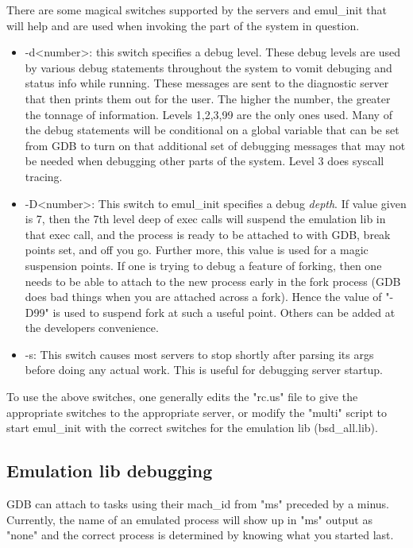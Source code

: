 There are some magical switches supported by the servers and emul\_init
that will help and are used when invoking the part of the system in question.
\begin{itemize}
\item{-d<number>}: this switch specifies a debug level.  These debug levels are
used by various debug statements throughout the system to vomit debuging and
status
info while running.  These messages are sent to the diagnostic server
that then prints them out for the user.  The higher the number, the greater
the tonnage of information.  Levels 1,2,3,99 are the only ones used.
Many of the debug statements will be conditional on a global variable
that can be set from GDB to turn on that additional set of debugging messages
that may not be needed when debugging other parts of the system. Level 3
does syscall tracing.

\item{-D<number>}:  This switch to emul\_init specifies a debug {\em depth}.
If value given
is 7, then the 7th level deep of exec calls will suspend the emulation lib
in that exec call, and the process is ready to be attached to with GDB,
break points set, and off you go. Further more, this value is used
for a magic suspension points.  If one is trying to debug a feature of forking,
then one needs to be able to attach to the new process early in the fork
process (GDB does bad things when you are attached across a fork).  Hence
the value of "-D99" is used to suspend fork at such a useful point.  Others
can be added at the developers convenience.

\item{-s}:  This switch causes most servers to stop shortly after parsing
its args before doing any actual work.  This is useful for debugging
server startup.
\end{itemize}
To use the above switches, one generally edits the "rc.us" file to
give the appropriate switches to the appropriate server, or modify
the "multi" script to start emul\_init with the correct switches for the
emulation lib (bsd\_all.lib).

\subsection{Emulation lib debugging}
GDB can attach to tasks using their mach\_id from "ms" preceded by a minus.
Currently, the name of an emulated process will show up in "ms" output as
"none" and the correct process is determined by knowing what you started last.

